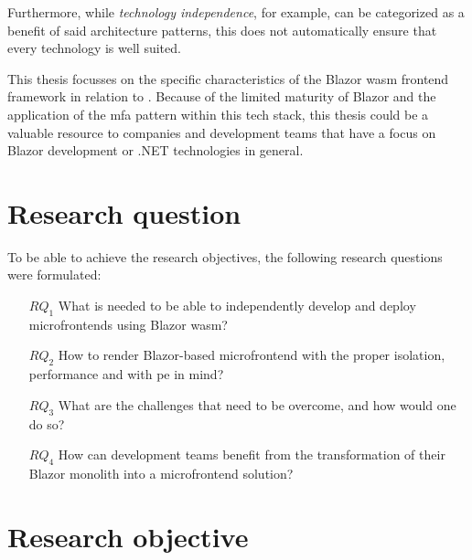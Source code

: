 Furthermore, while \textit{technology independence}, for example, can be
categorized as a benefit of said architecture patterns, this does not
automatically ensure that every technology is well suited. 

This thesis focusses on the specific characteristics of the Blazor \gls{wasm}
\gls{frontend} framework in relation to . Because of
the limited maturity of Blazor and the application of the \gls{mfa} pattern
within this tech stack, this thesis could be a valuable resource to companies
and development teams that have a focus on Blazor development or .NET
technologies in general.

\section{Research question}
\label{sec:research-question}


To be able to achieve the research objectives, the following research questions
were formulated:

\begin{itemize}
  \item[$RQ_1$] What is needed to be able to independently develop and deploy
  microfrontends using Blazor \gls{wasm}?
  \item[$RQ_2$] How to render Blazor-based \gls{microfrontend} with the proper
  isolation, performance and with \gls{pe} in mind?
  \item[$RQ_3$] What are the challenges that need to be overcome, and how would
  one do so? 
  \item[$RQ_4$] How can development teams benefit from the transformation of
  their Blazor monolith into a microfrontend solution?
\end{itemize}

\section{Research objective}
\label{sec:research-objective}


